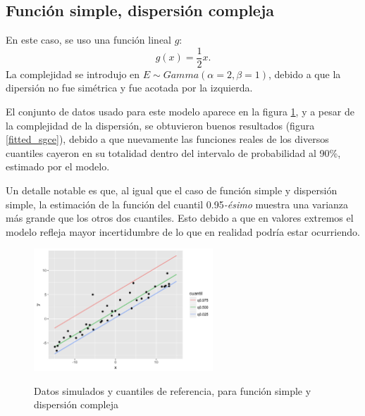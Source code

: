\subsection{Funci\'on simple, dispersi\'on compleja}

En este caso, se uso una funci\'on lineal $g$:
\begin{equation*}
    g(x) = \frac{1}{2} x.
\end{equation*}
La complejidad se introdujo en $E \sim \textit{Gamma}(\alpha = 2,\beta = 1)$, debido a que la dipersi\'on no fue sim\'etrica y fue acotada por la izquierda. 

El conjunto de datos usado para este modelo aparece en la figura \ref{sample_sgce}, y a pesar de la complejidad de la dispersi\'on, se obtuvieron buenos resultados (figura \ref{fitted_sgce}), debido a que nuevamente las funciones reales de los diversos cuantiles cayeron en su totalidad dentro del intervalo de probabilidad al 90\%, estimado por el modelo.

Un detalle notable es que, al igual que el caso de funci\'on simple y dispersi\'on simple, la estimaci\'on de la funci\'on del cuantil 0.95\textit{-\'esimo} muestra una varianza m\'as grande que los otros dos cuantiles. Esto debido a que en valores extremos el modelo refleja mayor incertidumbre de lo que en realidad podr\'ia estar ocurriendo.

\begin{figure}[H]
	\centering
	\caption{Datos simulados y cuantiles de referencia, para funci\'on simple y dispersi\'on compleja}
	\includegraphics[width=0.60\textwidth]{Figures/Simulation/simple_g_complex_error/sample.png}
	\label{sample_sgce}
\end{figure}

